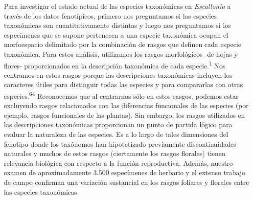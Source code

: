 \documentclass[
  11pt,
]{article}
\begin{document}
Para investigar el estado actual de las especies taxonómicas en \emph{Escallonia} a través de los datos fenotípicos, primero nos preguntamos si las especies taxonómicas son cuantitativamente distintas y luego nos preguntamos si los especímenes que se supone pertenecen a una especie taxonómica ocupan el morfoespacio delimitado por la combinación de rasgos que definen cada especie taxonómica. Para estos análisis, utilizamos los rasgos morfológicos -de hojas y flores- proporcionados en la descripción taxonómica de cada especie.\textsuperscript{1} Nos centramos en estos rasgos porque las descripciones taxonómicas incluyen los caracteres útiles para distinguir todas las especies y para compararlas con otras especies.\textsuperscript{64} Reconocemos que al centrarnos sólo en estos rasgos, podemos estar excluyendo rasgos relacionados con las diferencias funcionales de las especies (por ejemplo, rasgos funcionales de las plantas). Sin embargo, los rasgos utilizados en las descripciones taxonómicas proporcionan un punto de partida lógico para evaluar la naturaleza de las especies. Es a lo largo de tales dimensiones del fenotipo donde los taxónomos han hipotetizado previamente discontinuidades naturales y muchos de estos rasgos (ciertamente los rasgos florales) tienen relevancia biológica con respecto a la función reproductiva. Además, nuestro examen de aproximadamente 3.500 especímenes de herbario y el extenso trabajo de campo confirman una variación sustancial en los rasgos foliares y florales entre las especies taxonómicas.
\end{document}
